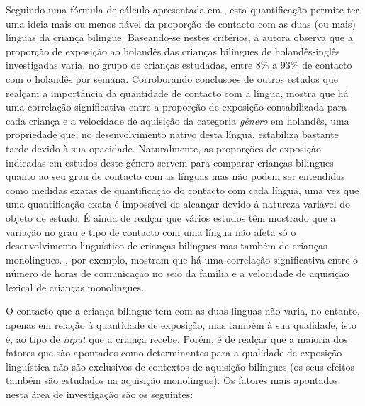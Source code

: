 \documentclass[output=paper]{LSP/langsci}
\begin{document}
Seguindo uma fórmula de cálculo apresentada em \cite{unsworth2013}, esta quantificação permite ter uma ideia mais ou menos fiável da proporção de contacto com as duas (ou mais) línguas da criança bilingue. Baseando-se nestes critérios, a autora observa que a proporção de exposição ao holandês das crianças bilingues de holandês-inglês investigadas varia, no grupo de crianças estudadas, entre 8\% a 93\% de contacto com o holandês por semana. Corroborando conclusões de outros estudos que realçam a importância da quantidade de contacto com a língua, \cite{unsworth2013} mostra que há uma correlação significativa entre a proporção de exposição contabilizada para cada criança e a velocidade de aquisição da categoria \textit{género} em holandês, uma propriedade que, no desenvolvimento nativo desta língua, estabiliza bastante tarde devido à sua opacidade. Naturalmente, as proporções de exposição indicadas em estudos deste género servem para comparar crianças bilingues quanto ao seu grau de contacto com as línguas mas não podem ser entendidas como medidas exatas de quantificação do contacto com cada língua, uma vez que uma quantificação exata é impossível de alcançar devido à natureza variável do objeto de estudo. É ainda de realçar que vários estudos têm mostrado que a variação no grau e tipo de contacto com uma língua não afeta só o desenvolvimento linguístico de crianças bilingues mas também de crianças monolingues. \cite{hartrisley1995}, por exemplo, mostram que há uma correlação significativa entre o número de horas de comunicação no seio da família e a velocidade de aquisição lexical de crianças monolingues.

O contacto que a criança bilingue tem com as duas línguas não varia, no entanto, apenas em relação à quantidade de exposição, mas também à sua qualidade, isto é, ao tipo de \textit{input} que a criança recebe. Porém, é de realçar que a maioria dos fatores que são apontados como determinantes para a qualidade de exposição linguística não são exclusivos de contextos de aquisição bilingues (os seus efeitos também são estudados na aquisição monolingue). Os fatores mais apontados nesta área de investigação são os seguintes:
\end{document}
